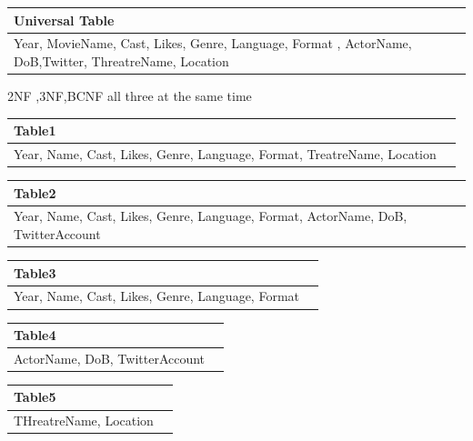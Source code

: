 \documentclass[10pt]{article}
\begin{document}
\begin{center}
 \begin{tabular}{| m{6em}|} 
 \hline
 Universal Table \\ [1ex] 
 \hline
 Year, MovieName, Cast, Likes, Genre, Language, Format , ActorName, DoB,Twitter, ThreatreName, Location \\
 
 \hline
 
\end{tabular}
\end{center}

2NF ,3NF,BCNF all three at the same time


\begin{tabular}{| m{6em} | m{8cm}|} 
 \hline
 Table1 \\ [1ex] 
 \hline
 Year, Name, Cast, Likes, Genre, Language, Format, TreatreName, Location \\ 
 \hline
 
\end{tabular}


\begin{tabular}{| m{6em} | m{8cm}|} 
 \hline
 Table2 \\ [1ex] 
 \hline
 Year, Name, Cast, Likes, Genre, Language, Format, ActorName, DoB, TwitterAccount \\ 
 \hline 
 
\end{tabular}


\begin{tabular}{| m{6em} | m{8cm}|} 
 \hline
 Table3 \\ [1ex] 
 \hline
 Year, Name, Cast, Likes, Genre, Language, Format \\ 
 \hline 
 
\end{tabular}


\begin{tabular}{| m{6em} | m{8cm}|} 
 \hline
 Table4 \\ [1ex] 
 \hline
  ActorName, DoB, TwitterAccount \\ 
 \hline 
 
\end{tabular}


 \begin{tabular}{| m{6em} | m{8cm}|} 
 \hline
 Table5 \\ [1ex] 
 \hline
  THreatreName, Location \\ 
 \hline 
 
\end{tabular}
\end{document}
